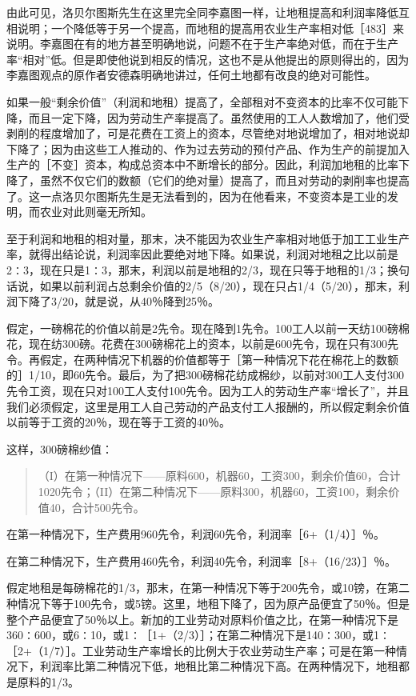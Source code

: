 由此可见，洛贝尔图斯先生在这里完全同李嘉图一样，让地租提高和利润率降低互相说明；一个降低等于另一个提高，而地租的提高用农业生产率相对低［483］来说明。李嘉图在有的地方甚至明确地说，问题不在于生产率绝对低，而在于生产率“相对”低。但是即使他说到相反的情况，这也不是从他提出的原则得出的，因为李嘉图观点的原作者安德森明确地讲过，任何土地都有改良的绝对可能性。

如果一般“剩余价值”（利润和地租）提高了，全部租对不变资本的比率不仅可能下降，而且一定下降，因为劳动生产率提高了。虽然使用的工人人数增加了，他们受剥削的程度增加了，可是花费在工资上的资本，尽管绝对地说增加了，相对地说却下降了；因为由这些工人推动的、作为过去劳动的预付产品、作为生产的前提加入生产的［不变］资本，构成总资本中不断增长的部分。因此，利润加地租的比率下降了，虽然不仅它们的数额（它们的绝对量）提高了，而且对劳动的剥削率也提高了。这一点洛贝尔图斯先生是无法看到的，因为在他看来，不变资本是工业的发明，而农业对此则毫无所知。

至于利润和地租的相对量，那末，决不能因为农业生产率相对地低于加工工业生产率，就得出结论说，利润率因此要绝对地下降。如果说，利润对地租之比以前是2∶3，现在只是1∶3，那末，利润以前是地租的2/3，现在只等于地租的1/3；换句话说，如果以前利润占总剩余价值的2/5（8/20），现在只占1/4（5/20），那末，利润下降了3/20，就是说，从40％降到25％。

假定，一磅棉花的价值以前是2先令。现在降到1先令。100工人以前一天纺100磅棉花，现在纺300磅。花费在300磅棉花上的资本，以前是600先令，现在只有300先令。再假定，在两种情况下机器的价值都等于［第一种情况下花在棉花上的数额的］1/10，即60先令。最后，为了把300磅棉花纺成棉纱，以前对300工人支付300先令工资，现在只对100工人支付100先令。因为工人的劳动生产率“增长了”，并且我们必须假定，这里是用工人自己劳动的产品支付工人报酬的，所以假定剩余价值以前等于工资的20％，现在等于工资的40％。

这样，300磅棉纱值：

\begin{quote}{（I）在第一种情况下——原料600，机器60，工资300，剩余价值60，合计1020先令；（II）在第二种情况下——原料300，机器60，工资100，剩余价值40，合计500先令。}\end{quote}

在第一种情况下，生产费用960先令，利润60先令，利润率［6+（1/4）］％。

在第二种情况下，生产费用460先令，利润40先令，利润率［8+（16/23）］％。

假定地租是每磅棉花的1/3，那末，在第一种情况下等于200先令，或10镑，在第二种情况下等于100先令，或5镑。这里，地租下降了，因为原产品便宜了50％。但是整个产品便宜了50％以上。新加的工业劳动对原料价值之比，在第一种情况下是360∶600，或6∶10，或1∶［1+（2/3）］；在第二种情况下是140∶300，或1∶［2+（1/7）］。工业劳动生产率增长的比例大于农业劳动生产率；可是在第一种情况下，利润率比第二种情况下低，地租比第二种情况下高。在两种情况下，地租都是原料的1/3。

